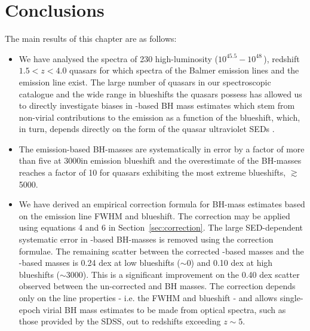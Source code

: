 \section{Conclusions}
\label{sec:conclusions}

The main results of this chapter are as follows: 

\begin{itemize}
\item We have analysed the spectra of 230 high-luminosity ($10^{45.5}-10^{48}$\,\ergs), redshift $1.5 < z < 4.0$ quasars for which spectra of the Balmer emission lines and the  emission line exist.
The large number of quasars in our spectroscopic catalogue and the wide range in  blueshifts the quasars possess has allowed us to directly investigate biases in -based BH mass estimates which stem from non-virial contributions to the  emission as a function of the  blueshift, which, in turn, depends directly on the form of the quasar ultraviolet SEDs \citep{richards11}.
\item The  emission-based BH-masses are systematically in error by a factor of more than five at 3000\kms in  emission blueshift and the overestimate of the BH-masses reaches a factor of 10 for quasars exhibiting the most extreme blueshifts, $\gtrsim$5000\kms. 
\item We have derived an empirical correction formula for BH-mass estimates based on the  emission line FWHM and blueshift.
The correction may be applied using equations 4 and 6 in Section~\ref{sec:correction}.
The large SED-dependent systematic error in -based BH-masses is removed using the correction formulae.
The remaining scatter between the corrected -based masses and the \hans-based masses is 0.24 dex at low  blueshifts ($\sim$0\kms) and 0.10 dex at high blueshifts ($\sim$3000\kms). 
This is a significant improvement on the 0.40 dex scatter observed between the un-corrected  and \ha BH masses. 
The correction depends only on the  line properties - i.e. the FWHM and blueshift - and allows single-epoch virial BH mass estimates to be made from optical spectra, such as those provided by the SDSS, out to redshifts exceeding $z\sim 5$. 
\end{itemize}




